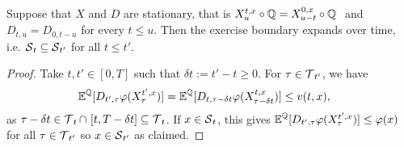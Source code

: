

\begin{proposition}\label{prop:monot}
Suppose that  $X$ and $D$ are stationary, that is $   
        X_u^{t,x} \circ \operatorname{\mathbb{Q}} = X_{u-t}^{0,x} \circ  \operatorname{\mathbb{Q}} \ $  and $D_{t,u} = D_{0,t-u}$ for every $t \le u $. 
Then the exercise boundary  expands over time, i.e. 
$ \operatorname{\mathcal{S}}_t \subseteq \operatorname{\mathcal{S}}_{t'}$ for all $t \le  t' $.

\end{proposition}
\begin{proof}
Take $t,t'\in [0,T]$ such that $\delta t := t'-t \ge 0$. %
 For  $\tau \in \operatorname{\mathcal{T}}_{t'}$, we have
\begin{align*}
    \operatorname{\mathbb{E}}^{\operatorname{\mathbb{Q}}}[D_{t',\tau}\varphi(X^{t',x}_{\tau})] &= \operatorname{\mathbb{E}}^{\operatorname{\mathbb{Q}}}[D_{t,\tau - \delta t }\varphi(X^{t,x}_{\tau - \delta t})] \le v(t,x), 
\end{align*}
as $\tau - \delta t \in \operatorname{\mathcal{T}}_t \cap \ [t,T-\delta t] \subseteq \operatorname{\mathcal{T}}_t$. If  $x\in \operatorname{\mathcal{S}}_t$, this gives   
$\operatorname{\mathbb{E}}^{\operatorname{\mathbb{Q}}}[D_{t',\tau}\varphi(X^{t',x}_{\tau})] \le  \varphi(x)$ for all $ \tau \in \operatorname{\mathcal{T}}_{t'} $ so  $x \in \operatorname{\mathcal{S}}_{t'}$ as claimed. 
\end{proof}


